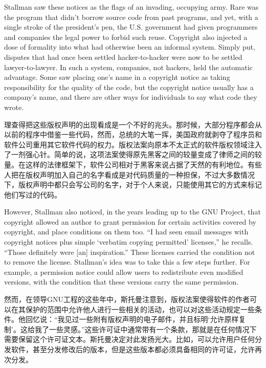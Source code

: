 \ifdefined\eng
Stallman saw these notices as the flags of an invading, occupying army. Rare was the program that didn't borrow source code from past programs, and yet, with a single stroke of the president's pen, the U.S. government had given programmers and companies the legal power to forbid such reuse.  Copyright also injected a dose of formality into what had otherwise been an informal system. Simply put, disputes that had once been settled hacker-to-hacker were now to be settled lawyer-to-lawyer. In such a system, companies, not hackers, held the automatic advantage.  Some saw placing one's name in a copyright notice as taking responsibility for the quality of the code, but the copyright notice usually has a company's name, and there are other ways for individuals to say what code they wrote.
\fi

\ifdefined\chs
理查得把这些版权声明的出现看成是一个不好的兆头。那时候，大部分程序都会从以前的程序中借鉴一些代码，然而，总统的大笔一挥，美国政府就剥夺了程序员和软件公司重用其它软件代码的权力。版权法案向原本不太正式的软件版权领域注入了一剂强心针。简单的说，这项法案使得原先黑客之间的较量变成了律师之间的较量。在这样的法律框架下，软件公司相对于黑客来说占据了天然的有利地位。有些人把在版权声明加入自己的名字看成是对代码质量的一种担保，不过大多数情况下，版权声明中都只会写公司的名字，对于个人来说，只能使用其它的方式来标记他们写过的代码。
\fi

\ifdefined\eng
However, Stallman also noticed, in the years leading up to the GNU Project, that copyright allowed an author to grant permission for certain activities covered by copyright, and place conditions on them too.  ``I had seen email messages with copyright notices plus simple `verbatim copying permitted' licenses,'' he recalls. ``Those definitely were [an] inspiration.''  These licenses carried the condition not to remove the license.  Stallman's idea was to take this a few steps further.  For example, a permission notice could allow users to redistribute even modified versions, with the condition that these versions carry the same permission.
\fi

\ifdefined\chs
然而，在领导GNU工程的这些年中，斯托曼注意到，版权法案使得软件的作者可以在其保护的范围中允许他人进行一些相关的活动，也可以对这些活动规定一些条件。他回忆说：``我见过一些附有版权声明的电子邮件，并且标明`允许原样复制'。这给我了一些灵感。''这些许可证中通常带有一个条款，那就是在任何情况下需要保留这个许可证文本。斯托曼决定对此发扬光大。比如，可以允许用户任何分发软件，甚至分发修改后的版本，但是这些版本都必须具备相同的许可证，允许再次分发。
\fi

